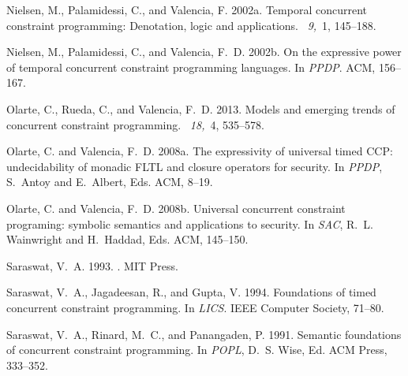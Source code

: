 \documentclass{tlp}
\begin{document}
\begin{thebibliography}{}
{\sc Nielsen, M.}, {\sc Palamidessi, C.}, {\sc and} {\sc Valencia, F.} 2002a.
\newblock Temporal concurrent constraint programming: Denotation, logic and
  applications.
~{\em 9,\/}~1, 145--188.

{\sc Nielsen, M.}, {\sc Palamidessi, C.}, {\sc and} {\sc Valencia, F.~D.}
  2002b.
\newblock On the expressive power of temporal concurrent constraint programming
  languages.
\newblock In {\em PPDP}. ACM, 156--167.

{\sc Olarte, C.}, {\sc Rueda, C.}, {\sc and} {\sc Valencia, F.~D.} 2013.
\newblock Models and emerging trends of concurrent constraint programming.
~{\em 18,\/}~4, 535--578.

{\sc Olarte, C.} {\sc and} {\sc Valencia, F.~D.} 2008a.
\newblock The expressivity of universal timed {C}{C}{P}: undecidability of
  monadic {F}{L}{T}{L} and closure operators for security.
\newblock In {\em PPDP}, {S.~Antoy} {and} {E.~Albert}, Eds. ACM, 8--19.

{\sc Olarte, C.} {\sc and} {\sc Valencia, F.~D.} 2008b.
\newblock Universal concurrent constraint programing: symbolic semantics and
  applications to security.
\newblock In {\em SAC}, {R.~L. Wainwright} {and} {H.~Haddad}, Eds. ACM,
  145--150.

{\sc Saraswat, V.~A.} 1993.
.
\newblock MIT Press.

{\sc Saraswat, V.~A.}, {\sc Jagadeesan, R.}, {\sc and} {\sc Gupta, V.} 1994.
\newblock Foundations of timed concurrent constraint programming.
\newblock In {\em LICS}. IEEE Computer Society, 71--80.

{\sc Saraswat, V.~A.}, {\sc Rinard, M.~C.}, {\sc and} {\sc Panangaden, P.}
  1991.
\newblock Semantic foundations of concurrent constraint programming.
\newblock In {\em POPL}, {D.~S. Wise}, Ed. ACM Press, 333--352.


\end{thebibliography}
\end{document}
